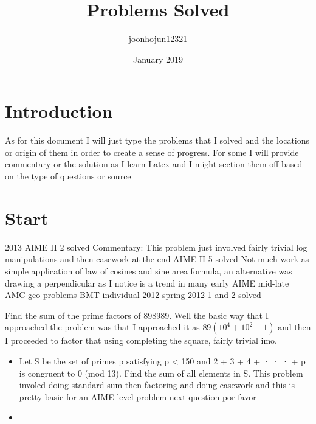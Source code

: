 \documentclass{article}
\title{Problems Solved}
\author{joonhojun12321 }
\date{January 2019}
\begin{document}
\maketitle

\section{Introduction}

As for this document I will just type the problems that I solved and the locations or origin of them in order to create a sense of progress. For some I will provide commentary or the solution as I learn Latex and I might section them off based on the type of questions or source

\section {Start}
2013 AIME II 2 solved
\newline
Commentary: This problem just involved fairly trivial log manipulations and then casework at the end
 AIME II 5 solved
\newline
Not much work as simple application of law of cosines and sine area formula, an alternative was drawing a perpendicular as I notice is a trend in many early AIME mid-late AMC geo problems
\newline
BMT individual 2012 spring 2012 1 and 2 solved

Find the sum of the prime factors of 898989.
Well the basic way that I approached the problem was that I approached it as $89(10^4+10^2+1)$ and then I proceeded to factor that using completing the square, fairly trivial imo.
\begin {itemize}
\item Let S be the set of primes p satisfying p < 150 and
2 + 3 + 4 + · · · + p is congruent to 0 (mod 13).
Find the sum of all elements in S. This problem involed doing standard sum then factoring and doing casework and this is pretty basic for an AIME level problem next question por favor
\item

\end{itemize}
\end{document}
